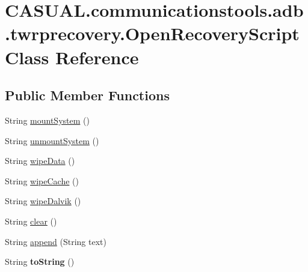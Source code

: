 \hypertarget{class_c_a_s_u_a_l_1_1communicationstools_1_1adb_1_1twrprecovery_1_1_open_recovery_script}{\section{C\-A\-S\-U\-A\-L.\-communicationstools.\-adb.\-twrprecovery.\-Open\-Recovery\-Script Class Reference}
\label{class_c_a_s_u_a_l_1_1communicationstools_1_1adb_1_1twrprecovery_1_1_open_recovery_script}
}
\subsection*{Public Member Functions}
\begin{DoxyCompactItemize}
\item 
String \hyperlink{class_c_a_s_u_a_l_1_1communicationstools_1_1adb_1_1twrprecovery_1_1_open_recovery_script_a2641b62172dc1476e7c8aad6affa49e9}{mount\-System} ()
\item 
String \hyperlink{class_c_a_s_u_a_l_1_1communicationstools_1_1adb_1_1twrprecovery_1_1_open_recovery_script_aab99289e51efe09025f1b466338f2168}{unmount\-System} ()
\item 
String \hyperlink{class_c_a_s_u_a_l_1_1communicationstools_1_1adb_1_1twrprecovery_1_1_open_recovery_script_abb5c9a8736ebfc0db21b8260e58f1cc1}{wipe\-Data} ()
\item 
String \hyperlink{class_c_a_s_u_a_l_1_1communicationstools_1_1adb_1_1twrprecovery_1_1_open_recovery_script_a4ef2c2c36ae48150cf1aa98d754655c4}{wipe\-Cache} ()
\item 
String \hyperlink{class_c_a_s_u_a_l_1_1communicationstools_1_1adb_1_1twrprecovery_1_1_open_recovery_script_a1eaa63b4ab5c759259621a6b33bec516}{wipe\-Dalvik} ()
\item 
String \hyperlink{class_c_a_s_u_a_l_1_1communicationstools_1_1adb_1_1twrprecovery_1_1_open_recovery_script_aec8050d5b495a16e46b23b0f5b373430}{clear} ()
\item 
String \hyperlink{class_c_a_s_u_a_l_1_1communicationstools_1_1adb_1_1twrprecovery_1_1_open_recovery_script_ac10870b38bae9e8aa7df32596a94da3f}{append} (String text)
\item 
\hypertarget{class_c_a_s_u_a_l_1_1communicationstools_1_1adb_1_1twrprecovery_1_1_open_recovery_script_a4cb0b0f74fd221bd39e4aac87ab69aa5}{String {\bfseries to\-String} ()}\label{class_c_a_s_u_a_l_1_1communicationstools_1_1adb_1_1twrprecovery_1_1_open_recovery_script_a4cb0b0f74fd221bd39e4aac87ab69aa5}


\end{DoxyCompactItemize}
